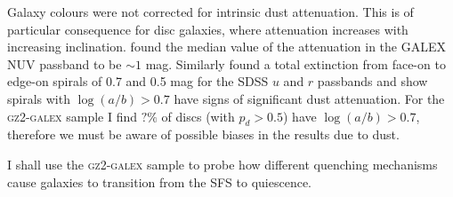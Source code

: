 Galaxy colours were not corrected for intrinsic dust attenuation. This is of particular consequence for disc galaxies, where attenuation increases with increasing inclination. \cite{Buat05} found the median value of the attenuation in the GALEX NUV passband to be $\sim 1$ mag. Similarly \cite{masters10a} found a total extinction from face-on to edge-on spirals of 0.7 and 0.5 mag for the SDSS $u$ and $r$ passbands and show spirals with $\log(a/b) > 0.7$ have signs of significant dust attenuation. For the \textsc{gz2-galex} sample I find $?\%$ of discs (with $p_d > 0.5$) have $\log(a/b) > 0.7$, therefore we must be aware of possible biases in the results due to dust. 

I shall use the \textsc{gz2-galex} sample to probe how different quenching mechanisms cause galaxies to transition from the SFS to quiescence. 
